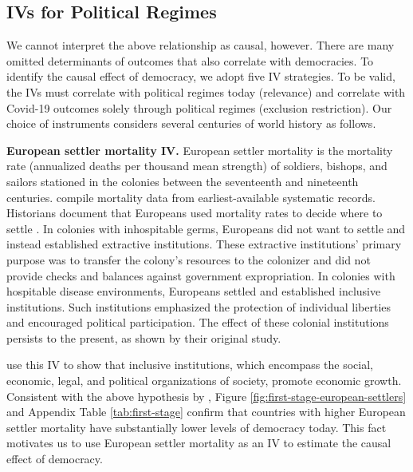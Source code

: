 
\subsection{IVs for Political Regimes} \label{subsec:instruments}

We cannot interpret the above relationship as causal, however. There are many omitted determinants of outcomes that also correlate with democracies. To identify the causal effect of democracy, we adopt five IV strategies. To be valid, the IVs must correlate with political regimes today (relevance) and correlate with Covid-19 outcomes solely through political regimes (exclusion restriction). Our choice of instruments considers several centuries of world history as follows. 

\textbf{European settler mortality IV.} European settler mortality is the mortality rate (annualized deaths per thousand mean strength) of soldiers, bishops, and sailors stationed in the colonies between the seventeenth and nineteenth centuries. \citet{acemogluColonialOriginsComparative2001} compile mortality data from earliest-available systematic records. Historians document that Europeans used mortality rates to decide where to settle \citep{curtinDeathMigrationEurope1989}. In colonies with inhospitable germs, Europeans did not want to settle and instead established extractive institutions. These extractive institutions' primary purpose was to transfer the colony's resources to the colonizer and did not provide checks and balances against government expropriation. In colonies with hospitable disease environments, Europeans settled and established inclusive institutions. Such institutions emphasized the protection of individual liberties and encouraged political participation. The effect of these colonial institutions persists to the present, as shown by their original study. 

\citet{acemogluColonialOriginsComparative2001} use this IV to show that inclusive institutions, which encompass the social, economic, legal, and political organizations of society, promote economic growth. 
Consistent with the above hypothesis by \citet{acemogluColonialOriginsComparative2001}, Figure \ref{fig:first-stage-european-settlers} and Appendix Table \ref{tab:first-stage} confirm that countries with higher European settler mortality have substantially lower levels of democracy today. This fact motivates us to use European settler mortality as an IV to estimate the causal effect of democracy. 


